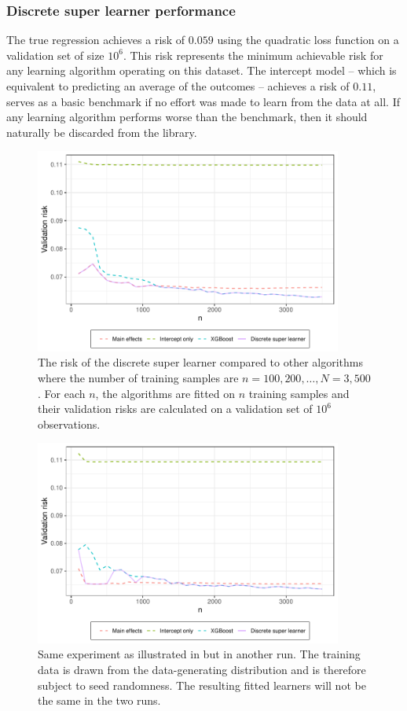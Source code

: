 \documentclass[./main.tex]{subfiles}
\begin{document}
\subsubsection{Discrete super learner performance}
The true regression achieves a risk of $ 0.059 $ using the quadratic loss function on a validation set of size $ 10^{6} $. This risk represents the minimum achievable risk for any learning algorithm operating on this dataset. The intercept model -- which is equivalent to predicting an average of the outcomes -- achieves a risk of $ 0.11 $, serves as a basic benchmark if no effort was made to learn from the data at all. If any learning algorithm performs worse than the benchmark, then it should naturally be discarded from the library.  
\begin{figure}[H]
    \centering
    \includegraphics[width=0.9\textwidth]{figures/losses_s22.pdf}
    \caption{The risk of the discrete super learner compared to other algorithms where the number of training samples are $n = 100, 200, \dots , N = 3,500 $. For each $ n $, the algorithms are fitted on $ n $ training samples and their validation risks are calculated on a validation set of $ 10^{6} $ observations.} 
    \label{fig:loss_min_of_both}
\end{figure}
\begin{figure}[H]
    \centering
    \includegraphics[width=0.9\textwidth]{figures/losses_s23.pdf}
    \caption{Same experiment as illustrated in  but in another run. The training data is drawn from the data-generating distribution and is therefore subject to seed randomness. The resulting fitted learners will not be the same in the two runs.}
    \label{fig:loss_jumps}
\end{figure}
\end{document}
